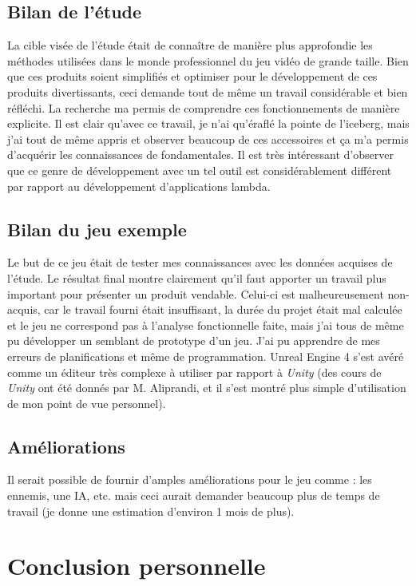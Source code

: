 \documentclass[11pt, a4paper, oneside]{article}
\begin{document}
\subsection{Bilan de l'étude}
La cible visée de l'étude était de connaître de manière plus approfondie les méthodes utilisées dans le monde professionnel du jeu vidéo de grande taille. Bien que ces produits soient simplifiés et optimiser pour le développement de ces produits divertissants, ceci demande tout de même un travail considérable et bien réfléchi. La recherche ma permis de comprendre ces fonctionnements de manière explicite. Il est clair qu'avec ce travail, je n'ai qu'éraflé la pointe de l'iceberg, mais j'ai tout de même appris et observer beaucoup de ces accessoires et ça m'a permis d'acquérir les connaissances de fondamentales. Il est très intéressant d'observer que ce genre de développement avec un tel outil est considérablement différent par rapport au développement d'applications lambda.

\subsection{Bilan du jeu exemple}
Le but de ce jeu était de tester mes connaissances avec les données acquises de l'étude. Le résultat final montre clairement qu'il faut apporter un travail plus important pour présenter un produit vendable. Celui-ci est malheureusement non-acquis, car le travail fourni était insuffisant, la durée du projet était mal calculée et le jeu ne correspond pas à l'analyse fonctionnelle faite, mais j'ai tous de même pu développer un semblant de prototype d'un jeu. J'ai pu apprendre de mes erreurs de planifications et même de programmation. Unreal Engine 4 s'est avéré comme un éditeur très complexe à utiliser par rapport à \emph{Unity} (des cours de \emph{Unity} ont été donnés par M. Aliprandi, et il s'est montré plus simple d'utilisation de mon point de vue personnel).

\subsection{Améliorations}
Il serait possible de fournir d'amples améliorations pour le jeu comme : les ennemis, une IA, etc. mais ceci aurait demander beaucoup plus de temps de travail (je donne une estimation d'environ 1 mois de plus).
\newpage
\section{Conclusion personnelle}
\end{document}
